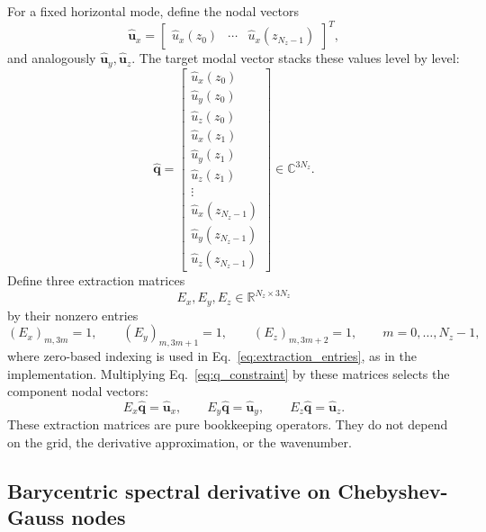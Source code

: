 \documentclass[11pt]{article}
\newcommand{\bfq}{\bm{q}}
\newcommand{\Ez}{E_z}
\newcommand{\Ex}{E_x}
\newcommand{\Ey}{E_y}
\begin{document}
For a fixed horizontal mode, define the nodal vectors
\[
  \widehat{\bm{u}}_x =
  \begin{bmatrix}
    \widehat{u}_x(z_0) & \cdots &
    \widehat{u}_x(z_{N_z-1})
  \end{bmatrix}^T,
\]
and analogously \(\widehat{\bm{u}}_y,\widehat{\bm{u}}_z\). The target modal
vector stacks these values level by level:
\begin{equation}
  \widehat{\bfq}
  =
  \begin{bmatrix}
    \widehat{u}_x(z_0)\\
    \widehat{u}_y(z_0)\\
    \widehat{u}_z(z_0)\\
    \widehat{u}_x(z_1)\\
    \widehat{u}_y(z_1)\\
    \widehat{u}_z(z_1)\\
    \vdots\\
    \widehat{u}_x(z_{N_z-1})\\
    \widehat{u}_y(z_{N_z-1})\\
    \widehat{u}_z(z_{N_z-1})
  \end{bmatrix}
  \in\mathbb{C}^{3N_z}.
  \label{eq:q_constraint}
\end{equation}
Define three extraction matrices
\[
  \Ex,\Ey,\Ez\in\mathbb{R}^{N_z\times 3N_z}
\]
by their nonzero entries
\begin{equation}
  (\Ex)_{m,3m}=1,\qquad
  (\Ey)_{m,3m+1}=1,\qquad
  (\Ez)_{m,3m+2}=1,
  \qquad m=0,\ldots,N_z-1,
  \label{eq:extraction_entries}
\end{equation}
where zero-based indexing is used in Eq.~\eqref{eq:extraction_entries}, as in
the implementation. Multiplying Eq.~\eqref{eq:q_constraint} by these matrices
selects the component nodal vectors:
\begin{equation}
  \Ex\widehat{\bfq}=\widehat{\bm{u}}_x,\qquad
  \Ey\widehat{\bfq}=\widehat{\bm{u}}_y,\qquad
  \Ez\widehat{\bfq}=\widehat{\bm{u}}_z.
  \label{eq:extraction_action}
\end{equation}
These extraction matrices are pure bookkeeping operators. They do not depend on
the grid, the derivative approximation, or the wavenumber.

\subsection{Barycentric spectral derivative on Chebyshev-Gauss nodes}
\end{document}
